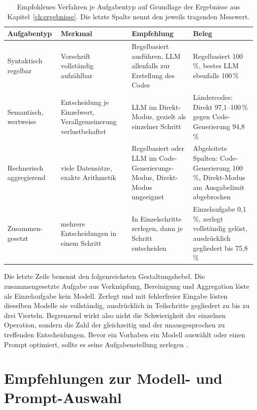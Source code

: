 \begin{table}[htbp]
    \centering
    \small
    \caption[Eignungsmatrix nach Aufgabentyp]{Empfohlenes Verfahren je Aufgabentyp auf Grundlage der Ergebnisse aus Kapitel~\ref{ch:ergebnisse}. Die letzte Spalte nennt den jeweils tragenden Messwert.}
    \label{tab:eignungsmatrix}
    \begin{tabularx}{\textwidth}{@{}p{2.4cm}XXX@{}}
        \toprule
        \textbf{Aufgabentyp} & \textbf{Merkmal} & \textbf{Empfehlung} & \textbf{Beleg} \\
        \midrule
        Syntaktisch regelbar & Vorschrift vollständig aufzählbar & Regelbasiert ausführen, \ac{LLM} allenfalls zur Erstellung des Codes & Regelbasiert 100\,\%, bestes \ac{LLM} ebenfalls 100\,\% \\
        \addlinespace
        Semantisch, wertweise & Entscheidung je Einzelwert, Verallgemeinerung verlustbehaftet & \ac{LLM} im Direkt-Modus, gezielt als einzelner Schritt & Ländercodes: Direkt 97,1--100\,\% gegen Code-Generierung 94,8\,\% \\
        \addlinespace
        Rechnerisch aggregierend & viele Datensätze, exakte Arithmetik & Regelbasiert oder \ac{LLM} im Code-Generierungs-Modus, Direkt-Modus ungeeignet & Abgeleitete Spalten: Code-Generierung 100\,\%, Direkt-Modus am Ausgabelimit abgebrochen \\
        \addlinespace
        Zusammen-  gesetzt & mehrere Entscheidungen in einem Schritt & In Einzelschritte zerlegen, dann je Schritt entscheiden & Einzelaufgabe 0,1\,\%, zerlegt vollständig gelöst, ausdrücklich gegliedert bis 75,8\,\% \\
        \bottomrule
    \end{tabularx}
\end{table}

Die letzte Zeile benennt den folgenreichsten Gestaltungshebel. Die zusammengesetzte Aufgabe aus Verknüpfung, Bereinigung und Aggregation löste als Einzelaufgabe kein Modell. Zerlegt und mit fehlerfreier Eingabe lösten dieselben Modelle sie vollständig, ausdrücklich in Teilschritte gegliedert zu bis zu drei Vierteln. Begrenzend wirkt also nicht die Schwierigkeit der einzelnen Operation, sondern die Zahl der gleichzeitig und der unausgesprochen zu treffenden Entscheidungen. Bevor ein Vorhaben ein Modell auswählt oder einen Prompt optimiert, sollte es seine Aufgabenstellung zerlegen \autocite{khanOverviewETLTechniques2024,nagabhyruBridgingTraditionalETL2022}.

\section{Empfehlungen zur Modell- und Prompt-Auswahl}
\label{sec:empfehlungen-auswahl}

